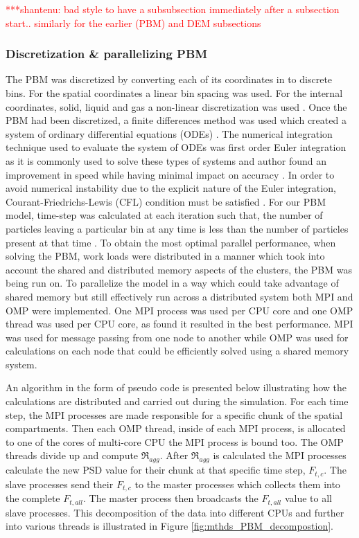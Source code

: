 \documentclass[preprint,11pt,authoryear]{elsarticle}
\newcommand{\jhanote}[1]{ {\textcolor{red} { ***shantenu: #1 }}}
\newcommand{\jhanote}[1]{}
\begin{document}
\jhanote{bad style to have a subsubsection immediately after a subsection start.. similarly for the earlier (PBM) and DEM subsections}

\subsubsection{Discretization \& parallelizing PBM}
The PBM was discretized by converting each of its coordinates in to discrete bins. For the spatial 
coordinates a linear bin spacing was used. For the internal coordinates, solid, liquid and gas a 
non-linear discretization was used \citep{barrasso2012}. 
Once the PBM had been discretized, a finite differences method was 
used which created a system of ordinary differential equations (ODEs) \citep{Barrasso2015cerd}. The 
numerical integration technique used to evaluate the system of ODEs was first order Euler integration 
as it is commonly used to solve these types of systems and author found an improvement in  speed while
having minimal impact on accuracy \citep{Barrasso2013}. In order to avoid numerical instability due 
to the explicit nature of the Euler integration, Courant-Friedrichs-Lewis (CFL) condition must be 
satisfied \citep{courant1967}. For our PBM model, time-step was calculated at each iteration such 
that, the number of particles leaving a particular bin at any time is less than the number of 
particles present at that time \citep{Ramachandran2010}. To obtain the most optimal parallel 
performance, when solving the PBM, work loads were distributed in a manner which took into account 
the shared and distributed memory aspects of the clusters, the PBM was being run on. To 
parallelize the model in a way which could take advantage of shared memory but still effectively run 
across a distributed system both MPI and OMP were implemented. One MPI process was used per CPU core and one OMP 
thread was used per CPU core, as \cite{Bettencourt2017} found it resulted in the best performance. 
MPI was used for message passing from one node to another while OMP was used for calculations on each 
node that could be efficiently solved using a shared memory system. 

An algorithm in the form of pseudo code is presented below illustrating how the calculations are distributed and 
carried out 
during the simulation. For each time step, the MPI processes are made responsible for a specific chunk 
of the spatial compartments. Then each OMP thread, inside of each MPI process, is allocated to one of 
the cores of multi-core CPU the MPI process is bound too. The OMP threads divide up and 
compute $\Re_{agg}$. After $\Re_{agg}$ is calculated the MPI 
processes calculate the new PSD value for their chunk at that specific time step, $F_{t,c}$. The slave 
processes send their $F_{t,c}$ to the master processes which collects them into the complete 
$F_{t,all}$. The master process then broadcasts the $F_{t,all}$ value to all slave processes. This 
decomposition of the data into different CPUs and further into various threads is illustrated in Figure 
\ref{fig:mthds_PBM_decompostion}.	
\end{document}
